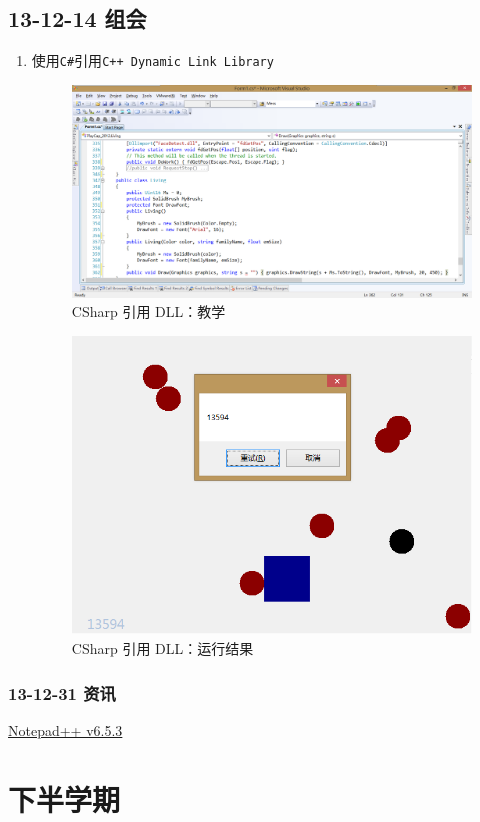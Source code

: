 \documentclass[]{report}
\begin{document}
\section{13-12-14 组会}
\begin{enumerate}
	\item 使用\verb|C#|引用\verb|C++ Dynamic Link Library|
\begin{figure}
\centering
\includegraphics[width=1\linewidth]{./PIC/PlayCap}
\caption{CSharp 引用 DLL：教学}
\label{fig:PlayCap}
\end{figure}
\begin{figure}
\centering
\includegraphics[width=0.7\linewidth]{./PIC/PlayCapO}
\caption{CSharp 引用 DLL：运行结果}
\label{fig:PlayCapO}
\end{figure}
\end{enumerate}
	\subsection{13-12-31 资讯}
			\href{http://notepad-plus-plus.org/zh/download/v6.5.3.html}{Notepad++ v6.5.3}
\chapter{下半学期}
\end{document}
